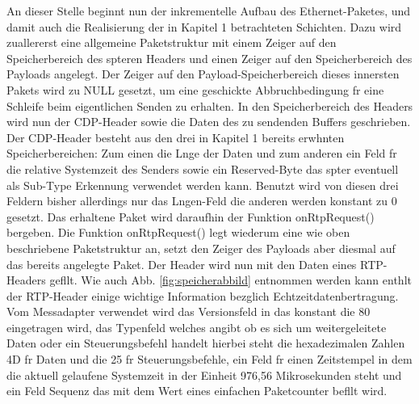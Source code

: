 \documentclass[a4paper]{book}%
\begin{document}
An dieser Stelle beginnt nun der inkrementelle Aufbau des Ethernet-Paketes, und damit auch die Realisierung der in Kapitel 1 betrachteten Schichten.
Dazu wird zuallererst eine allgemeine Paketstruktur mit einem Zeiger auf den Speicherbereich des spteren Headers  und einen Zeiger auf den Speicherbereich des Payloads angelegt.
Der Zeiger auf den Payload-Speicherbereich dieses innersten Pakets wird zu NULL gesetzt, um eine geschickte Abbruchbedingung fr eine Schleife beim eigentlichen Senden zu erhalten. In den Speicherbereich des Headers wird nun der CDP-Header sowie die Daten des zu sendenden Buffers geschrieben. Der CDP-Header besteht aus den drei in Kapitel 1 bereits erwhnten Speicherbereichen: Zum einen die Lnge der Daten und zum anderen ein  Feld fr die relative Systemzeit des Senders sowie ein Reserved-Byte das spter eventuell als Sub-Type Erkennung verwendet werden kann. Benutzt wird von diesen drei Feldern bisher allerdings nur das Lngen-Feld die anderen werden konstant zu 0 gesetzt. Das erhaltene Paket wird daraufhin der Funktion onRtpRequest() bergeben. Die Funktion onRtpRequest() legt wiederum eine wie oben beschriebene Paketstruktur an, setzt den Zeiger des Payloads aber diesmal auf das bereits angelegte Paket. Der Header wird nun mit den Daten eines RTP-Headers gefllt. Wie auch Abb. \ref{fig:speicherabbild} entnommen werden kann enthlt der RTP-Header einige wichtige Information bezglich Echtzeitdatenbertragung. Vom Messadapter verwendet wird das Versionsfeld in das konstant die 80 eingetragen wird, das Typenfeld welches angibt ob es sich um weitergeleitete Daten oder ein Steuerungsbefehl handelt hierbei steht die hexadezimalen Zahlen 4D fr Daten und die 25 fr Steuerungsbefehle, ein Feld fr einen Zeitstempel in dem die aktuell gelaufene Systemzeit in der Einheit 976,56 Mikrosekunden steht und ein Feld Sequenz das mit dem Wert eines einfachen Paketcounter befllt wird. 
\end{document}
